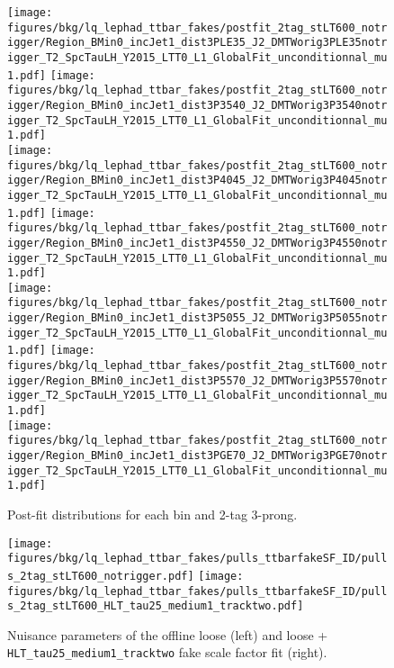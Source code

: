 \begin{figure}
    \centering
    \texttt{[image: figures/bkg/lq\_lephad\_ttbar\_fakes/postfit\_2tag\_stLT600\_notrigger/Region\_BMin0\_incJet1\_dist3PLE35\_J2\_DMTWorig3PLE35notrigger\_T2\_SpcTauLH\_Y2015\_LTT0\_L1\_GlobalFit\_unconditionnal\_mu1.pdf]}
    \texttt{[image: figures/bkg/lq\_lephad\_ttbar\_fakes/postfit\_2tag\_stLT600\_notrigger/Region\_BMin0\_incJet1\_dist3P3540\_J2\_DMTWorig3P3540notrigger\_T2\_SpcTauLH\_Y2015\_LTT0\_L1\_GlobalFit\_unconditionnal\_mu1.pdf]} \\
    \texttt{[image: figures/bkg/lq\_lephad\_ttbar\_fakes/postfit\_2tag\_stLT600\_notrigger/Region\_BMin0\_incJet1\_dist3P4045\_J2\_DMTWorig3P4045notrigger\_T2\_SpcTauLH\_Y2015\_LTT0\_L1\_GlobalFit\_unconditionnal\_mu1.pdf]}
    \texttt{[image: figures/bkg/lq\_lephad\_ttbar\_fakes/postfit\_2tag\_stLT600\_notrigger/Region\_BMin0\_incJet1\_dist3P4550\_J2\_DMTWorig3P4550notrigger\_T2\_SpcTauLH\_Y2015\_LTT0\_L1\_GlobalFit\_unconditionnal\_mu1.pdf]} \\
    \texttt{[image: figures/bkg/lq\_lephad\_ttbar\_fakes/postfit\_2tag\_stLT600\_notrigger/Region\_BMin0\_incJet1\_dist3P5055\_J2\_DMTWorig3P5055notrigger\_T2\_SpcTauLH\_Y2015\_LTT0\_L1\_GlobalFit\_unconditionnal\_mu1.pdf]}
    \texttt{[image: figures/bkg/lq\_lephad\_ttbar\_fakes/postfit\_2tag\_stLT600\_notrigger/Region\_BMin0\_incJet1\_dist3P5570\_J2\_DMTWorig3P5570notrigger\_T2\_SpcTauLH\_Y2015\_LTT0\_L1\_GlobalFit\_unconditionnal\_mu1.pdf]} \\
    \texttt{[image: figures/bkg/lq\_lephad\_ttbar\_fakes/postfit\_2tag\_stLT600\_notrigger/Region\_BMin0\_incJet1\_dist3PGE70\_J2\_DMTWorig3PGE70notrigger\_T2\_SpcTauLH\_Y2015\_LTT0\_L1\_GlobalFit\_unconditionnal\_mu1.pdf]}
  \caption{Post-fit \mtw distributions for each \pT bin and 2-tag 3-prong.}
  \label{fig:lq_ttbarfake_mtw_3p_postfit}
\end{figure}

\begin{figure}
    \centering
    \texttt{[image: figures/bkg/lq\_lephad\_ttbar\_fakes/pulls\_ttbarfakeSF\_ID/pulls\_2tag\_stLT600\_notrigger.pdf]}
    \texttt{[image: figures/bkg/lq\_lephad\_ttbar\_fakes/pulls\_ttbarfakeSF\_ID/pulls\_2tag\_stLT600\_HLT\_tau25\_medium1\_tracktwo.pdf]}
  \caption{Nuisance parameters of the offline loose (left) and
           loose + \texttt{HLT\_tau25\_medium1\_tracktwo} fake \tauhad \ttbar scale factor fit (right).}
  \label{fig:lq_ttbarfake_nps1}
\end{figure}

